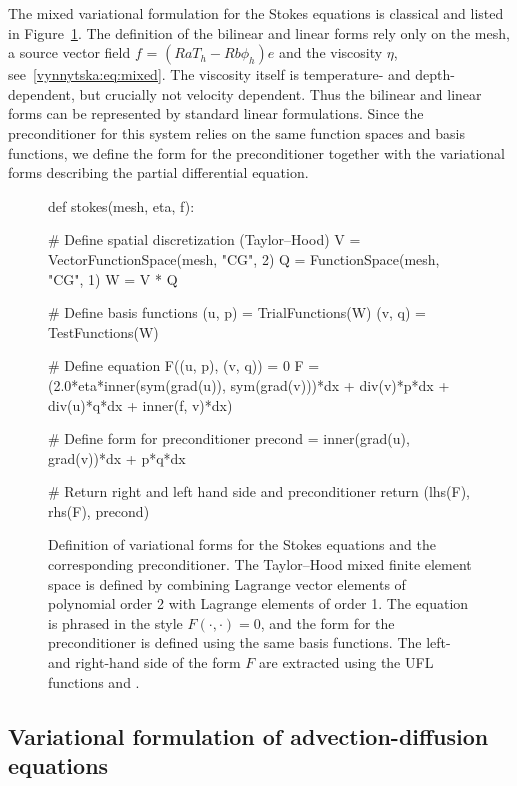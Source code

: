 The mixed variational formulation for the Stokes equations is
classical and listed in Figure~\ref{vynnytska:fig:stokes}. The
definition of the bilinear and linear forms rely only on the mesh, a
source vector field $f$ = $(Ra T_h - Rb \phi_h) e$ and the viscosity
$\eta$, see~\eqref{vynnytska:eq:mixed}.  The viscosity itself is
temperature- and depth-dependent, but crucially not velocity
dependent.  Thus the bilinear and linear forms can be represented by
standard linear formulations.  Since the preconditioner for this
system relies on the same function spaces and basis functions, we
define the form for the preconditioner together with the variational
forms describing the partial differential equation.
\begin{figure}
  \begin{python}
def stokes(mesh, eta, f):

    # Define spatial discretization (Taylor--Hood)
    V = VectorFunctionSpace(mesh, "CG", 2)
    Q = FunctionSpace(mesh, "CG", 1)
    W = V * Q

    # Define basis functions
    (u, p) = TrialFunctions(W)
    (v, q) = TestFunctions(W)

    # Define equation F((u, p), (v, q)) = 0
    F = (2.0*eta*inner(sym(grad(u)), sym(grad(v)))*dx
         + div(v)*p*dx
         + div(u)*q*dx
         + inner(f, v)*dx)

    # Define form for preconditioner
    precond = inner(grad(u), grad(v))*dx + p*q*dx

    # Return right and left hand side and preconditioner
    return (lhs(F), rhs(F), precond)
  \end{python}

  \caption{Definition of variational forms for the Stokes equations
    and the corresponding preconditioner. The Taylor--Hood mixed
    finite element space is defined by combining Lagrange vector
    elements of polynomial order 2 with Lagrange elements of order
    1. The equation is phrased in the style $F(\cdot, \cdot) = 0$, and
    the form for the preconditioner is defined using the same basis
    functions. The left- and right-hand side of the form $F$ are
    extracted using the UFL functions 
    and .}
  \label{vynnytska:fig:stokes}
\end{figure}

\subsection{Variational formulation of advection-diffusion equations}

